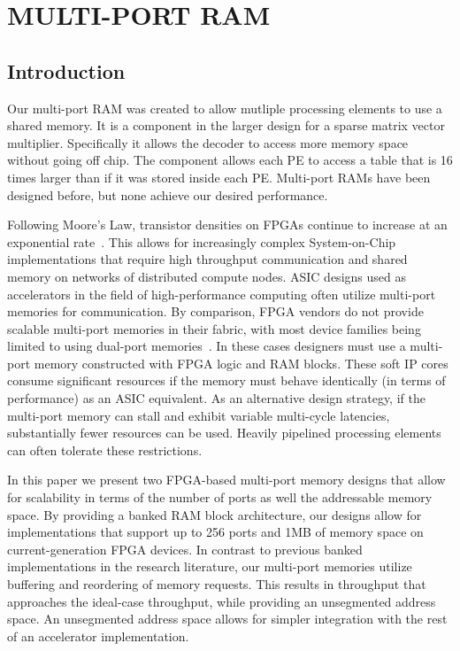 \chapter{MULTI-PORT RAM}
\label{chapter:scratchpad}
\section{Introduction}
Our multi-port RAM was created to allow mutliple processing elements to use a shared memory. It is a component in the larger design for a sparse matrix vector multiplier. Specifically it allows the decoder to access more memory space without going off chip. The component allows each PE to access a table that is 16 times larger than if it was stored inside each PE. Multi-port RAMs have been designed before, but none achieve our desired performance.


Following Moore's Law, transistor densities on FPGAs continue to increase at an exponential rate~\cite{fpga_2032}. This allows for increasingly complex System-on-Chip implementations that require high throughput communication and shared memory on networks of distributed compute nodes. ASIC designs used as accelerators in the field of high-performance computing often utilize multi-port memories for communication. By comparison, FPGA vendors do not provide scalable multi-port memories in their fabric, with most device families being limited to using dual-port memories~\cite{f-scratch:altera, f-scratch:xilinx}. In these cases designers must use a multi-port memory constructed with FPGA logic and RAM blocks. These soft IP cores consume significant resources if the memory must behave identically (in terms of performance) as an ASIC equivalent. As an alternative design strategy, if the multi-port memory can stall and exhibit variable multi-cycle latencies, substantially fewer resources can be used. Heavily pipelined processing elements can often tolerate these restrictions.

In this paper we present two FPGA-based multi-port memory designs that allow for scalability in terms of the number of ports as well the addressable memory space. By providing a banked RAM block architecture, our designs allow for implementations that support up to 256 ports and 1MB of memory space on current-generation FPGA devices. In contrast to previous banked implementations in the research literature, our multi-port memories utilize buffering and reordering of memory requests. This results in throughput that approaches the ideal-case throughput, while providing an unsegmented address space. An unsegmented address space allows for simpler integration with the rest of an accelerator implementation.


